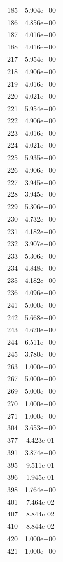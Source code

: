 \documentclass[12pt]{article}
\begin{document}
\begin{longtable}{@{}cc@{}}
185 & 5.904e+00 \\
186 & 4.856e+00 \\
187 & 4.016e+00 \\
188 & 4.016e+00 \\
217 & 5.954e+00 \\
218 & 4.906e+00 \\
219 & 4.016e+00 \\
220 & 4.021e+00 \\
221 & 5.954e+00 \\
222 & 4.906e+00 \\
223 & 4.016e+00 \\
224 & 4.021e+00 \\
225 & 5.935e+00 \\
226 & 4.906e+00 \\
227 & 3.945e+00 \\
228 & 3.945e+00 \\
229 & 5.306e+00 \\
230 & 4.732e+00 \\
231 & 4.182e+00 \\
232 & 3.907e+00 \\
233 & 5.306e+00 \\
234 & 4.848e+00 \\
235 & 4.182e+00 \\
236 & 4.096e+00 \\
241 & 5.000e+00 \\
242 & 5.668e+00 \\
243 & 4.620e+00 \\
244 & 6.511e+00 \\
245 & 3.780e+00 \\
263 & 1.000e+00 \\
267 & 5.000e+00 \\
269 & 5.000e+00 \\
270 & 1.000e+00 \\
271 & 1.000e+00 \\
304 & 3.653e+00 \\
377 & 4.423e-01 \\
391 & 3.874e+00 \\
395 & 9.511e-01 \\
396 & 1.945e-01 \\
398 & 1.764e+00 \\
401 & 7.464e-02 \\
407 & 8.844e-02 \\
410 & 8.844e-02 \\
420 & 1.000e+00 \\
421 & 1.000e+00 \\

\end{longtable}
\end{document}
